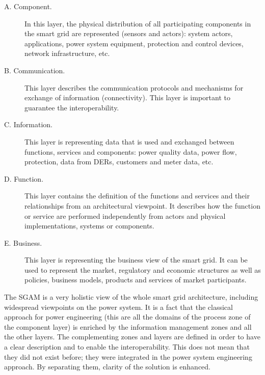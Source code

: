 \documentclass[a4paper,11pt,twoside,openright]{report}
\begin{document}
\begin{description}
	\item[A. Component.] In this layer, the physical distribution of all participating components in the smart grid are represented (sensors and actors): system actors, applications, power system equipment, protection and control devices, network infrastructure, etc. 
	\item[B. Communication.] This layer describes the communication protocols and mechanisms for exchange of information (connectivity). This layer is important to guarantee the interoperability. 
	\item[C. Information.] This layer is representing data that is used and exchanged between functions, services and components: power quality data, power flow, protection, data from DERs, customers and meter data, etc.
	\item[D. Function.] This layer contains the definition of the functions and services and their relationships from an architectural viewpoint.  It describes how the function or service are performed independently from actors and physical implementations, systems or components.
	\item[E. Business.] This layer is representing the business view of the smart grid. It can be used to represent the market, regulatory and economic structures as well as policies, business models, products and services of market participants. 
	
\end{description}

The SGAM is a very holistic view of the whole smart grid architecture, including widespread viewpoints on the power system. It is a fact that the classical approach for power engineering  (this are all the domains of the process zone of the component layer) is enriched by the information management zones and all the other layers. The complementing zones and layers are defined in order to have a clear description and to enable the interoperability. This does not mean that they did not exist before; they were integrated in the power system engineering approach. By separating them, clarity of the solution is enhanced.
\end{document}
